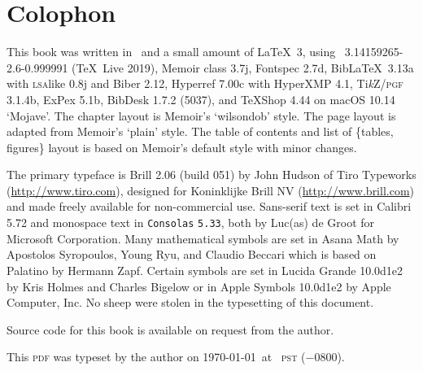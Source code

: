 

\chapter{Colophon}

\vspace*{\baselineskip}
\noindent{}This book was written in \LaTeXe\ and a small amount of \LaTeX\ 3,
using \XeLaTeX\ 3.14159265-2.6-0.999991 (\TeX\ Live 2019),
Memoir class 3.7j,
Fontspec 2.7d,
Bib\LaTeX\ 3.13a
	with \textsc{lsa}like 0.8j
	and Biber 2.12,
Hyperref 7.00c with HyperXMP 4.1,
Ti\textit{k}Z/\textsc{\MakeLowercase{PGF}} 3.1.4b,
ExPex 5.1b,
BibDesk 1.7.2 (5037),
and \TeX{}Shop 4.44
on macOS 10.14 ‘Mojave’.
The chapter layout is Memoir’s ‘wilsondob’ style. The page layout is adapted from Memoir’s ‘plain’ style. The table of contents and list of \{tables, figures\} layout is based on Memoir’s default style with minor changes.

\vspace*{\baselineskip}
\noindent{}The primary typeface is Brill 2.06 (build 051) by John Hudson of Tiro Typeworks (\url{http://www.tiro.com}), designed for Koninklijke Brill NV (\url{http://www.brill.com}) and made freely available for non-commercial use. Sans-serif text is set in \textsf{Calibri 5.72} and monospace text in \texttt{Consolas} \texttt{5.33}, both by Luc(\:as\:) de Groot for Microsoft Corporation. Many mathematical symbols are set in {\mathemafont Asana} {\mathemafont Math} {} by Apostolos Syropoulos, Young Ryu, and Claudio Beccari which is based on
Palatino
by Hermann Zapf. Certain symbols are set in {\ckfont Lucida} {\ckfont Grande} {\ckfont 10.0d1e2} by Kris Holmes and Charles Bigelow or in {\symfont Apple} {\symfont Symbols} {\symfont 10.0d1e2} by Apple Computer, Inc. No sheep were stolen in the typesetting of this document.

\vspace*{\baselineskip}
\noindent{}Source code for this book is available on request from the author.

\vspace*{\baselineskip}
\noindent{}This \textsc{\MakeLowercase{PDF}} was typeset by the author on
	\today\
	at
	\printtime\
	\textsc{\MakeLowercase{PST}} (\:−0800\:).